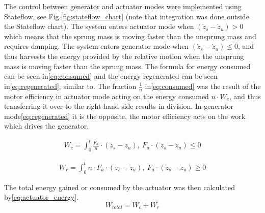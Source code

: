 The control between generator and actuator modes were implemented using Stateflow, see Fig.\:\ref{fig:stateflow_chart} (note that integration was done outside the Stateflow chart). The system enters actuator mode when $ (\dot{z}_s - \dot{z}_u) > 0$ which means that the sprung mass is moving faster than the unsprung mass and requires damping. The system enters generator mode when $ (\dot{z}_s - \dot{z}_u) \le 0$, and thus harvests the energy provided by the relative motion when the unsprung mass is moving faster than the sprung mass. The formula for energy consumed can be seen in\:\eqref{eq:consumed} and the energy regenerated can be seen in\:\eqref{eq:regenerated}, similar to\:\cite{yinPerformanceEvaluationActive2015}. The fraction $\frac{1}{n}$ in\:\eqref{eq:consumed} was the result of the motor efficiency in actuator mode acting on the energy consumed $n \cdot W_c$, and thus transferring it over to the right hand side results in division. In generator mode\:\eqref{eq:regenerated} it is the opposite, the motor efficiency acts on the work which drives the generator.
\begin{center}
    \begin{equation}
        \begin{split}
            \label{eq:consumed}
            W_c = \int_{0}^{t} \frac{F_a}{n} \cdot (\dot{z}_s - \dot{z}_u), \: F_a \cdot (\dot{z}_s - \dot{z}_u) \le 0
        \end{split}
    \end{equation}
\end{center}
\begin{center}
    \begin{equation}
        \begin{split}
            \label{eq:regenerated}
            W_r = \int_{0}^{t} n \cdot F_a \cdot (\dot{z}_s - \dot{z}_u), \: F_a \cdot (\dot{z}_s - \dot{z}_u) \ge 0
        \end{split}
    \end{equation}
\end{center}
The total energy gained or consumed by the actuator was then calculated by\:\eqref{eq:actuator_energy}.
\begin{equation}
    \label{eq:actuator_energy}
    W_{total} = W_c + W_r
\end{equation}
